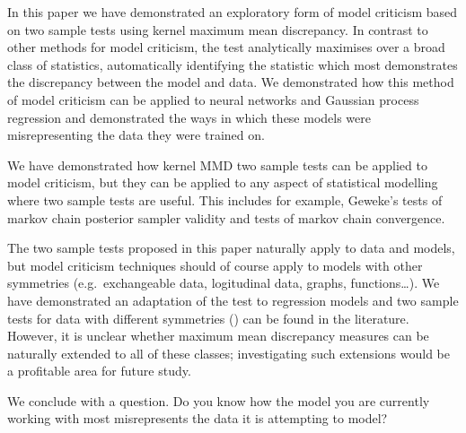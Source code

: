 \documentclass{article} %
\def\eg{e.g.\ }
\begin{document}
In this paper we have demonstrated an exploratory form of model criticism based on two sample tests using kernel maximum mean discrepancy.
In contrast to other methods for model criticism, the test analytically maximises over a broad class of statistics, automatically identifying the statistic which most demonstrates the discrepancy between the model and data.
We demonstrated how this method of model criticism can be applied to neural networks and Gaussian process regression and demonstrated the ways in which these models were misrepresenting the data they were trained on.

We have demonstrated how kernel MMD two sample tests can be applied to model criticism, but they can be applied to any aspect of statistical modelling where two sample tests are useful.
This includes for example, Geweke's tests of markov chain posterior sampler validity \citep{Geweke2004-yx} and tests of markov chain convergence.

The two sample tests proposed in this paper naturally apply to \iid data and models, but model criticism techniques should of course apply to models with other symmetries (\eg exchangeable data, logitudinal data, graphs, functions\ldots).
We have demonstrated an adaptation of the test to regression models and two sample tests for data with different symmetries () can be found in the literature.
However, it is unclear whether maximum mean discrepancy measures can be naturally extended to all of these classes; investigating such extensions would be a profitable area for future study.

We conclude with a question.
Do you know how the model you are currently working with most misrepresents the data it is attempting to model?

\newpage



\end{document}
